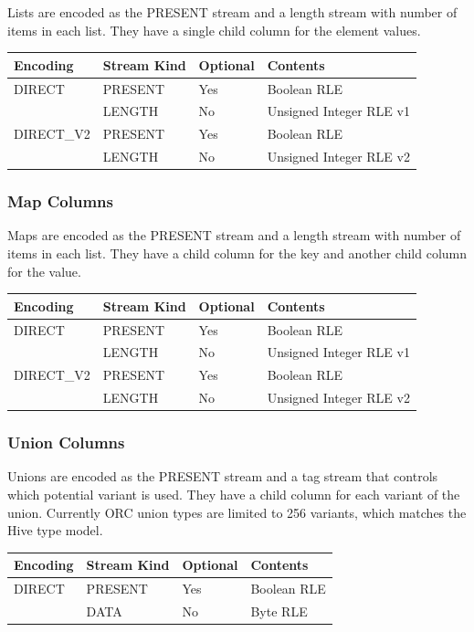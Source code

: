 \documentclass{article}
\begin{document}
Lists are encoded as the PRESENT stream and a length stream with
number of items in each list. They have a single child column for the
element values.

\vspace{10pt}
\begin{tabular}{| l | l | l | l |}
\hline
Encoding & Stream Kind & Optional & Contents \\
\hline
DIRECT & PRESENT & Yes & Boolean RLE\\
       & LENGTH  & No  & Unsigned Integer RLE v1\\
\hline
DIRECT\_V2 & PRESENT & Yes & Boolean RLE\\
           & LENGTH  & No  & Unsigned Integer RLE v2\\
\hline
\end{tabular}

\subsubsection{Map Columns}

Maps are encoded as the PRESENT stream and a length stream with number
of items in each list. They have a child column for the key and
another child column for the value.

\vspace{10pt}
\begin{tabular}{| l | l | l | l |}
\hline
Encoding & Stream Kind & Optional & Contents \\
\hline
DIRECT & PRESENT & Yes & Boolean RLE\\
       & LENGTH  & No  & Unsigned Integer RLE v1\\
\hline
DIRECT\_V2 & PRESENT & Yes & Boolean RLE\\
           & LENGTH  & No  & Unsigned Integer RLE v2\\
\hline
\end{tabular}

\subsubsection{Union Columns}

Unions are encoded as the PRESENT stream and a tag stream that controls which
potential variant is used. They have a child column for each variant of the
union. Currently ORC union types are limited to 256 variants, which matches
the Hive type model.

\vspace{10pt}
\begin{tabular}{| l | l | l | l |}
\hline
Encoding & Stream Kind & Optional & Contents \\
\hline
DIRECT & PRESENT & Yes & Boolean RLE\\
       & DATA    & No  & Byte RLE\\
\hline
\end{tabular}
\end{document}
